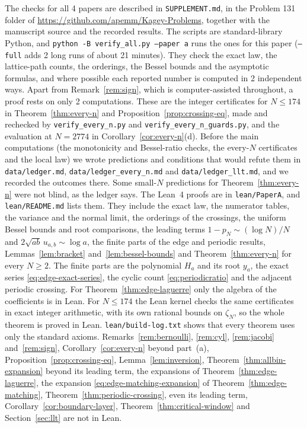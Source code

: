 \documentclass[11pt]{article}
\theoremstyle{definition}
\theoremstyle{remark}
\begin{document}
The checks for all 4 papers are described in \texttt{SUPPLEMENT.md}, in the
Problem 131 folder of \url{https://github.com/apemm/Kagey-Problems}, together
with the manuscript source and the recorded results. The scripts are
standard-library Python, and \texttt{python -B verify\_all.py --paper a} runs
the ones for this paper (\texttt{--full} adds 2 long runs of about 21
minutes). They check the exact law, the lattice-path counts, the orderings,
the Bessel bounds and the asymptotic formulas, and where possible each
reported number is computed in 2 independent ways. Apart from
Remark~\ref{rem:sign}, which is computer-assisted throughout, a proof rests on
only 2 computations. These are the integer certificates for $N\le174$ in
Theorem~\ref{thm:every-n} and Proposition~\ref{prop:crossing-eq}, made and
rechecked by \texttt{verify\_every\_n.py} and
\texttt{verify\_every\_n\_guards.py}, and the evaluation at $N=2774$ in
Corollary~\ref{cor:every-n}(d). Before the main computations (the
monotonicity and Bessel-ratio checks, the every-$N$ certificates and the local
law) we wrote
predictions and conditions that would refute them in \texttt{data/ledger.md},
\texttt{data/ledger\_every\_n.md} and \texttt{data/ledger\_llt.md}, and we
recorded the outcomes there. Some small-$N$ predictions for
Theorem~\ref{thm:every-n} were not blind, as the ledger says. The Lean~4
proofs are in \texttt{lean/PaperA}, and \texttt{lean/README.md} lists them.
They include the exact law, the numerator tables, the variance and the normal
limit, the orderings of the crossings, the uniform Bessel bounds and root
comparisons, the leading terms $1-p_N\sim(\log N)/N$ and
$2\sqrt{ab}\,u_{a,b}\sim\log a$, the finite parts of the edge and periodic
results, Lemmas~\ref{lem:bracket} and~\ref{lem:bessel-bounds} and
Theorem~\ref{thm:every-n} for every $N\ge2$. The finite parts are the
polynomial $H_a$ and its root $y_a$, the exact series
\eqref{eq:edge-exact-series}, the cyclic count \eqref{eq:periodicratio} and
the adjacent periodic crossing. For Theorem~\ref{thm:edge-laguerre} only the
algebra of the coefficients is in Lean. For $N\le174$ the Lean kernel checks
the same certificates in exact integer arithmetic, with its own rational
bounds on $\zeta_N$, so the whole theorem is proved in Lean.
\texttt{lean/build-log.txt} shows that every theorem uses only the standard
axioms. Remarks~\ref{rem:bernoulli}, \ref{rem:cyl}, \ref{rem:jacobi}
and~\ref{rem:sign}, Corollary~\ref{cor:every-n} beyond part~(a),
Proposition~\ref{prop:crossing-eq}, Lemma~\ref{lem:inversion},
Theorem~\ref{thm:allbin-expansion} beyond its leading term, the expansions
of Theorem~\ref{thm:edge-laguerre}, the expansion
\eqref{eq:edge-matching-expansion} of Theorem~\ref{thm:edge-matching},
Theorem~\ref{thm:periodic-crossing}, even its leading term,
Corollary~\ref{cor:boundary-layer}, Theorem~\ref{thm:critical-window} and
Section~\ref{sec:llt} are not in Lean.
\end{document}
